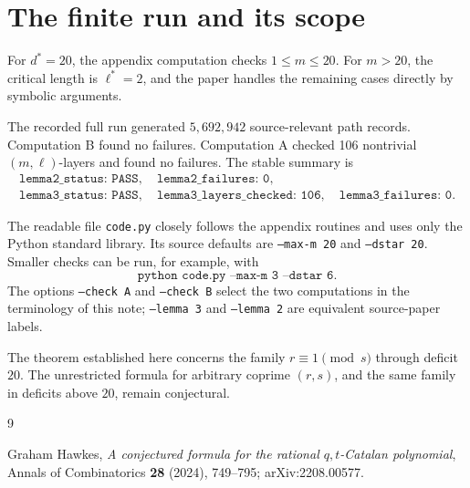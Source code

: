 \documentclass{article}
\begin{document}
\section{The finite run and its scope}

For \(d^*=20\), the appendix computation checks \(1\leq m\leq20\).  For
\(m>20\), the critical length is \(\ell^*=2\), and the paper handles the
remaining cases directly by symbolic arguments.

The recorded full run generated \(5{,}692{,}942\) source-relevant path
records.  Computation B found no failures.  Computation A checked 106
nontrivial \((m,\ell)\)-layers and found no failures.  The stable summary is
\[
\begin{array}{l}
\texttt{lemma2\_status: PASS},\quad
\texttt{lemma2\_failures: 0},\\
\texttt{lemma3\_status: PASS},\quad
\texttt{lemma3\_layers\_checked: 106},\quad
\texttt{lemma3\_failures: 0}.
\end{array}
\]

The readable file \texttt{code.py} closely follows the appendix routines and
uses only the Python standard library.  Its source defaults are
\texttt{--max-m 20} and \texttt{--dstar 20}.  Smaller checks can be run, for
example, with
\[
  \texttt{python code.py --max-m 3 --dstar 6}.
\]
The options \texttt{--check A} and \texttt{--check B} select the two
computations in the terminology of this note; \texttt{--lemma 3} and
\texttt{--lemma 2} are equivalent source-paper labels.

The theorem established here concerns the family \(r\equiv1\pmod s\) through
deficit \(20\).  The unrestricted formula for arbitrary coprime \((r,s)\),
and the same family in deficits above \(20\), remain conjectural.

\begin{thebibliography}{9}

Graham Hawkes,
\emph{A conjectured formula for the rational \(q,t\)-Catalan polynomial},
Annals of Combinatorics \textbf{28} (2024), 749--795;
arXiv:2208.00577.

\end{thebibliography}
\end{document}
